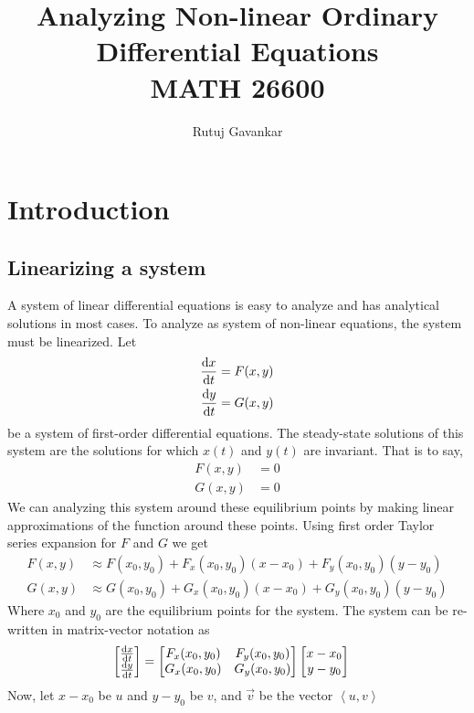 \documentclass[12pt,1in]{article}
\title{Analyzing Non-linear Ordinary Differential Equations\\ {\small MATH 26600}}
\author{Rutuj Gavankar}
\date{}
\begin{document}
\maketitle

\section{Introduction}

\subsection{Linearizing a system}
A system of linear differential equations is easy to analyze and has analytical solutions in most cases. To analyze as system of non-linear equations, the system must be linearized. 
Let 
\begin{align}
\derivative{x}{t} &= F(x, y) \\
\derivative{y}{t} &= G(x , y)
\end{align}
be a system of first-order differential equations. The steady-state solutions of this system are the solutions for which  $x(t)$ and $y(t)$ are invariant. That is to say,
\begin{align}
    F(x,y) &= 0 \\
    G(x,y) &= 0
\end{align}
We can analyzing this system around these equilibrium points by making linear approximations of the function around these points. Using first order Taylor series expansion for $F$ and $G$ we get
\begin{align}
    F(x,y) &\approx F(x_0, y_0) + F_x(x_0, y_0)(x - x_0) + F_y(x_0, y_0)(y - y_0) \\
    G(x,y) &\approx G(x_0, y_0) + G_x(x_0, y_0)(x - x_0) + G_y(x_0, y_0)(y - y_0)
\end{align}
Where $x_0$ and $y_0$ are the equilibrium points for the system. The system can be re-written in matrix-vector notation as 
\begin{align}
    \begin{bmatrix}
    \derivative{x}{t} \\
    \derivative{y}{t}
    \end{bmatrix} &= 
    \begin{bmatrix}
    F_x(x_0, y_0) & F_y(x_0, y_0)\\
    G_x(x_0, y_0) & G_y(x_0, y_0)
    \end{bmatrix}
    \begin{bmatrix}
    x - x_0 \\
    y - y_0
    \end{bmatrix}
\end{align}Now, let $x - x_0$ be $u$ and $y - y_0$ be $v$, and $\Vec{v}$ be the vector $\left<u ,v\right>$
\end{document}
